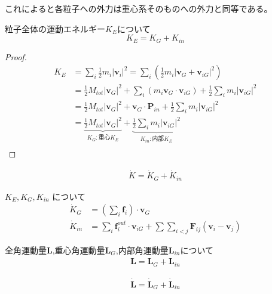 \documentclass[dvipdfmx,uplatex]{jsarticle}
\begin{document}
これによると各粒子への外力は重心系そのものへの外力と同等である。

\begin{theo}
粒子全体の運動エネルギー$K_E$について \\
$$
K_E = K_G + K_{in}
$$
\end{theo}

\begin{proof}
  \begin{align*}
    K_E &= \sum_i \frac{1}{2} m_i |\bm{v}_i|^2
    = \sum_i \left( \frac{1}{2} m_i | \bm{v}_G + \bm{v}_{iG} |^2 \right)\\
    &= \frac{1}{2} M_{tot} |\bm{v}_G|^2 + \sum_i ( m_i \bm{v}_G \cdot \bm{v}_{iG} ) + \frac{1}{2} \sum_i m_i |\bm{v}_{iG}|^2 \\
    &= \frac{1}{2} M_{tot} |\bm{v}_G|^2 + \bm{v}_G \cdot \bm{P}_{in} + \frac{1}{2} \sum_i m_i |\bm{v}_{iG}|^2 \\
    &= \underbrace{\frac{1}{2} M_{tot} |\bm{v}_G|^2}_{K_G:重心K_E} + \underbrace{\frac{1}{2} \sum_i m_i |\bm{v}_{iG}|^2}_{K_{in}:内部K_E} \\
  \end{align*}
\end{proof}

\begin{cor}
\begin{align*}
\dot{K} = \dot{K}_G + \dot{K}_{in}
\end{align*}
\end{cor}

\begin{theo}
$K_E, K_G, K_{in}$ について \\
\begin{align*}
\dot{K}_G &= \left( \sum_i \bm{f}_i \right) \cdot \bm{v}_G \\
\dot{K}_{in} &= \sum_i \bm{f}^{out}_i \cdot \bm{v}_{iG} + \sum\sum_{i<j} \bm{F}_{ij} (\bm{v}_i - \bm{v}_j)
\end{align*}
\end{theo}

\begin{theo}
全角運動量$\bm{L}$,重心角運動量$\bm{L}_G$,内部角運動量$\bm{L}_{in}$について \\
\begin{align*}
\bm{L} = \bm{L}_G + \bm{L}_{in}
\end{align*}
\end{theo}

\begin{cor}
\begin{align*}
\dot{\bm{L}} = \dot{\bm{L}}_G + \dot{\bm{L}}_{in}
\end{align*}
\end{cor}
\end{document}
